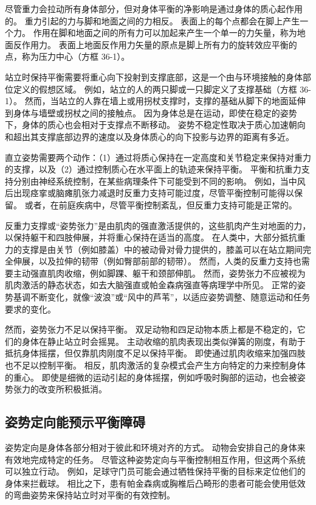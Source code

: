 尽管重力会拉动所有身体部分，但对身体平衡的净影响是通过身体的质心起作用的。 重力引起的力与脚和地面之间的力相反。 表面上的每个点都会在脚上产生一个力。 作用在脚和地面之间的所有力可以加起来产生一个单一的力矢量，称为地面反作用力。 表面上地面反作用力矢量的原点是脚上所有力的旋转效应平衡的点，称为压力中心（方框 36-1）。

站立时保持平衡需要将重心向下投射到支撑底部，这是一个由与环境接触的身体部位定义的假想区域。 例如，站立的人的两只脚或一只脚定义了支撑基础（方框 36-1）。 然而，当站立的人靠在墙上或用拐杖支撑时，支撑的基础从脚下的地面延伸到身体与墙壁或拐杖之间的接触点。 因为身体总是在运动，即使在稳定的姿势下，身体的质心也会相对于支撑点不断移动。 姿势不稳定性取决于质心加速朝向和超出其支撑底部边界的速度以及身体质心的向下投影与边界的距离有多近。

直立姿势需要两个动作：（1）通过将质心保持在一定高度和关节稳定来保持对重力的支撑，以及（2）通过控制质心在水平面上的轨迹来保持平衡。 平衡和抗重力支持分别由神经系统控制，在某些病理条件下可能受到不同的影响。 例如，当中风后出现痉挛或脑瘫肌张力减退时反重力支持可能过度，尽管平衡控制可能得以保留。 或者，在前庭疾病中，尽管平衡控制紊乱，但反重力支持可能是正常的。

反重力支撑或“姿势张力”是由肌肉的强直激活提供的，这些肌肉产生对地面的力，以保持躯干和四肢伸展，并将重心保持在适当的高度。 在人类中，大部分抵抗重力的支撑是由关节（例如膝盖）中的被动骨对骨力提供的，膝盖可以在站立期间完全伸展，以及拉伸的韧带（例如臀部前部的韧带）。 然而，人类的反重力支持也需要主动强直肌肉收缩，例如脚踝、躯干和颈部伸肌。 然而，姿势张力不应被视为肌肉激活的静态状态，如去大脑强直或帕金森病强直等病理学中所见。 正常的姿势基调不断变化，就像“波浪”或“风中的芦苇”，以适应姿势调整、随意运动和任务要求的变化。

然而，姿势张力不足以保持平衡。 双足动物和四足动物本质上都是不稳定的，它们的身体在静止站立时会摇晃。 主动收缩的肌肉表现出类似弹簧的刚度，有助于抵抗身体摇摆，但仅靠肌肉刚度不足以保持平衡。 即使通过肌肉收缩来加强四肢也不足以控制平衡。 相反，肌肉激活的复杂模式会产生方向特定的力来控制身体的重心。 即使是细微的运动引起的身体摇摆，例如呼吸时胸部的运动，也会被姿势张力的改变所积极抵消。


\subsection{姿势定向能预示平衡障碍}
姿势定向是身体各部分相对于彼此和环境对齐的方式。 动物会安排自己的身体来有效地完成特定的任务。 尽管这种姿势定向与平衡控制相互作用，但这两个系统可以独立行动。 例如，足球守门员可能会通过牺牲保持平衡的目标来定位他们的身体来拦截球。 相比之下，患有帕金森病或胸椎后凸畸形的患者可能会使用低效的弯曲姿势来保持站立时对平衡的有效控制。

